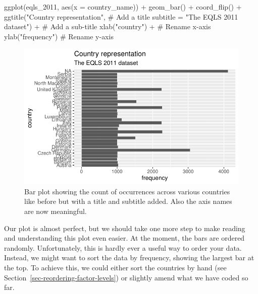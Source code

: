 \documentclass[
  letterpaper,
  DIV=11,
  numbers=noendperiod]{scrreprt}
\newenvironment{Shaded}{\begin{snugshade}}{\end{snugshade}}
\newcommand{\AttributeTok}[1]{\textcolor[rgb]{0.40,0.45,0.13}{#1}}
\newcommand{\CommentTok}[1]{\textcolor[rgb]{0.37,0.37,0.37}{#1}}
\newcommand{\FunctionTok}[1]{\textcolor[rgb]{0.28,0.35,0.67}{#1}}
\newcommand{\NormalTok}[1]{\textcolor[rgb]{0.00,0.23,0.31}{#1}}
\newcommand{\SpecialCharTok}[1]{\textcolor[rgb]{0.37,0.37,0.37}{#1}}
\newcommand{\StringTok}[1]{\textcolor[rgb]{0.13,0.47,0.30}{#1}}
\begin{document}
\begin{Shaded}
\begin{Highlighting}[]
\FunctionTok{ggplot}\NormalTok{(eqls\_2011, }\FunctionTok{aes}\NormalTok{(}\AttributeTok{x =}\NormalTok{ country\_name)) }\SpecialCharTok{+}
  \FunctionTok{geom\_bar}\NormalTok{() }\SpecialCharTok{+}
  \FunctionTok{coord\_flip}\NormalTok{() }\SpecialCharTok{+}
  \FunctionTok{ggtitle}\NormalTok{(}\StringTok{"Country representation"}\NormalTok{,              }\CommentTok{\# Add a title}
          \AttributeTok{subtitle =} \StringTok{"The EQLS 2011 dataset"}\NormalTok{) }\SpecialCharTok{+}  \CommentTok{\# Add a sub{-}title}
  \FunctionTok{xlab}\NormalTok{(}\StringTok{"country"}\NormalTok{) }\SpecialCharTok{+}                              \CommentTok{\# Rename x{-}axis}
  \FunctionTok{ylab}\NormalTok{(}\StringTok{"frequency"}\NormalTok{)                              }\CommentTok{\# Rename y{-}axis}
\end{Highlighting}
\end{Shaded}

\begin{figure}[H]

{\centering \includegraphics{08_descriptive_statistics_files/figure-latex/country-barplot-extras-formatted-1.pdf}

}

\caption{Bar plot showing the count of occurrences across various
countries like before but with a title and subtitle added. Also the axis
names are now meaningful.}

\end{figure}%

Our plot is almost perfect, but we should take one more step to make
reading and understanding this plot even easier. At the moment, the bars
are ordered randomly. Unfortunately, this is hardly ever a useful way to
order your data. Instead, we might want to sort the data by frequency,
showing the largest bar at the top. To achieve this, we could either
sort the countries by hand (see
Section~\ref{sec-reordering-factor-levels}) or slightly amend what we
have coded so far.
\end{document}
